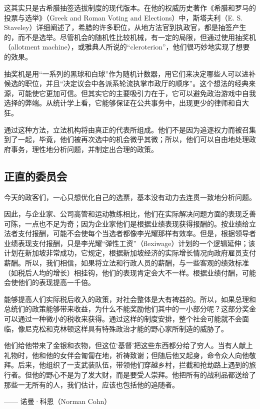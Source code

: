 这其实只是古希腊抽签选拔制度的现代版本。在他的权威历史著作《希腊和罗马的投票与选举》（Greek and Roman Voting and Elections）中，斯塔夫利（E. S. Staveley）详细阐述了，希腊的许多职位，从地方法官到执政官，都是抽签产生的，而不是选举。尽管机会的随机性比较机械，有一定的局限，但通过使用抽奖机（allotment machine），或雅典人所说的“cleroterion”，他们很巧妙地实现了想要的效果。

抽奖机是用“一系列的黑球和白球”作为随机计数器，用它们来决定哪些人可以进补候选的职位，并且“决定议会中各派系轮流执掌市政厅的顺序”。这个想法的经典来源，可能使它更加可信。但其实它的主要吸引力在于，它可以避免政治游戏中自我选择的弊端。从统计学上看，它能够保证在公共事务中，出现更少的律师和自大狂。

通过这种方法，立法机构将由真正的代表所组成。他们不是因为追逐权力而被召集到了一起，毕竟，他们被再次选中的机会微乎其微；所以，他们可以自由地处理政府事务，理性地分析问题，并制定出合理的政策。

\subsection{正直的委员会}
今天的政客们，一心只想优化自己的选票，基本没有动力去连贯一致地分析问题。

因此，与企业家、公司高管和运动教练相比，他们在实际解决问题方面的表现乏善可陈，一点也不足为奇；因为企业家他们是根据业绩表现获得报酬的。按业绩给立法者支付报酬，可能不会使每个当选者都像李光耀那样有效率。但是，根据领导者业绩表现支付报酬，只是李光耀“弹性工资”（flexiwage）计划的一个逻辑延伸；该计划在新加坡非常成功，它规定，根据新加坡经济的实际增长情况向政府雇员支付薪酬。所以，我们相信，如果将立法和行政人员的薪酬，与一些客观的绩效标准（如税后人均的增长）相挂钩，他们的表现肯定会大不一样。根据业绩付酬，可能会使他们的表现提高一千倍。

能够提高人们实际税后收入的政策，对社会整体是大有裨益的。所以，如果总理和总统们的政策能够带来收益，为什么不能奖励他们其中的一小部分呢？这部分奖金可以通过一种微小的税收来获得。通过这样的制度安排，整个社会可能就不会面临，像尼克松和克林顿这样具有特殊政治才能的野心家所制造的威胁了。

\begin{tcolorbox}
他们给他带来了金银和衣物，但这位‘基督’把这些东西都分给了穷人。当有人献上礼物时，他和他的女伴会匍匐在地，祈祷致谢；但随后他又起身，命令众人向他敬拜。后来，他组织了一支武装队伍，带领他们穿越乡村，拦截和抢劫路上遇到的旅行者。但他的野心不是为了发大财，而是要受人崇拜。他把所有的战利品都送给了那些一无所有的人，我们估计，应该也包括他的追随者。
\begin{flushright}
—— 诺曼·科恩（Norman Cohn）
\end{flushright}
\end{tcolorbox}


